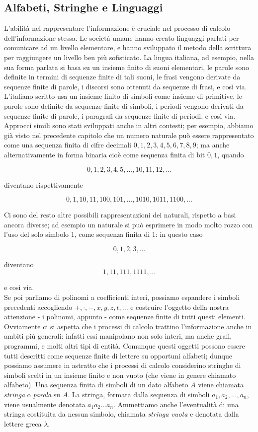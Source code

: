 \subsection{Alfabeti, Stringhe e Linguaggi}

L'abilità nel rappresentare l'informazione è cruciale nel processo di calcolo\\
dell'informazione stessa. Le società umane hanno creato linguaggi parlati
per comunicare ad un livello elementare, e hanno sviluppato il metodo della
scrittura per raggiungere un livello ben più sofisticato.
La lingua italiana, ad esempio, nella
sua forma parlata si basa su un insieme finito di suoni elementari,
le parole sono definite in termini di sequenze finite di tali suoni, le frasi vengono derivate da
sequenze finite di parole, i discorsi sono ottenuti da sequenze di frasi, e così via.
L'italiano scritto usa un insieme finito di simboli come insieme di primitive, le
parole sono definite da sequenze finite di simboli, i periodi vengono derivati da
sequenze finite di parole, i paragrafi da sequenze finite di periodi, e così via.
Approcci simili sono stati sviluppati anche in altri contesti; per esempio, abbiamo
già visto nel precedente capitolo che un numero naturale può essere rappresentato
come una sequenza finita di cifre decimali $0, 1, 2, 3, 4, 5, 6, 7, 8, 9$; ma anche
alternativamente in forma binaria cioè come sequenza finita di bit $0, 1$, quando

\[
    0, 1, 2, 3, 4, 5, ... , 10, 11, 12, ...
\]

diventano rispettivamente

\[
    0, 1, 10, 11, 100, 101, ... , 1010, 1011, 1100, ...
\]

Ci sono del resto altre possibili rappresentazioni dei naturali,
rispetto a basi ancora diverse;
ad esempio un naturale si può esprimere in modo molto rozzo con l'uso
del solo simbolo 1, come sequenza finita di 1: in questo caso

\[
    0, 1, 2, 3, ...
\]

diventano
\[
    1, 11, 111, 1111, ...
\]

e così via.\\
Se poi parliamo di polinomi a coefficienti interi, possiamo espandere i simboli
precedenti accogliendo $+, \cdot, -, x, y, z, t, ...$ e costruire l'oggetto della
nostra attenzione - i polinomi, appunto - come sequenze finite di tutti questi
elementi. Ovviamente ci si aspetta che i processi di calcolo trattino
l'informazione anche in ambiti più generali:
infatti essi manipolano non solo interi, ma anche grafi, programmi, e molti altri
tipi di entità. Comunque questi oggetti possono essere tutti
descritti come sequenze finite di lettere su opportuni alfabeti; dunque possiamo
assumere in astratto che i processi di calcolo considerino stringhe di simboli
scelti in un insieme finito e non vuoto (che viene in genere chiamato alfabeto).
Una sequenza finita di simboli di un dato alfabeto $A$ viene chiamata \textit{stringa} o
\textit{parola} su $A$. La stringa, formata dalla sequenza di simboli
$a_1, a_2, ..., a_n$, viene usualmente denotata $a_1a_2...a_n$.
Ammettiamo anche l'eventualità di una stringa
costituita da nessun simbolo, chiamata \textit{stringa vuota} e denotata
dalla lettere greca $\lambda$.

